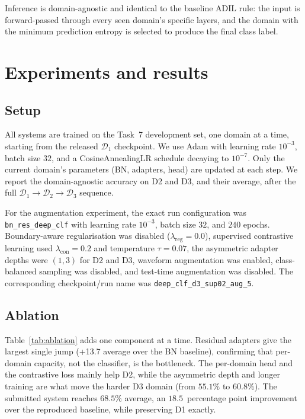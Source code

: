\documentclass{article}
\begin{document}
\begin{sloppy}
Inference is domain-agnostic and identical to the baseline ADIL rule: the
input is forward-passed through every seen domain's specific layers, and the
domain with the minimum prediction entropy is selected to produce the final
class label.


\section{Experiments and results}
\label{sec:results}

\subsection{Setup}
\label{ssec:setup}

All systems are trained on the Task~7 development set, one domain at a time,
starting from the released $\mathcal{D}_1$ checkpoint. We use Adam with
learning rate $10^{-3}$, batch size $32$, and a CosineAnnealingLR schedule
decaying to $10^{-7}$. Only the current domain's parameters (BN, adapters,
head) are updated at each step. We report the domain-agnostic accuracy on
D2 and D3, and their average, after the full $\mathcal{D}_1\!\rightarrow\!
\mathcal{D}_2\!\rightarrow\!\mathcal{D}_3$ sequence.

For the augmentation experiment, the exact run configuration was
\texttt{bn\_res\_deep\_clf} with learning rate $10^{-3}$, batch size $32$, and
$240$ epochs.  Boundary-aware regularisation was disabled
($\lambda_{\mathrm{reg}}=0.0$), supervised contrastive learning used
$\lambda_{\mathrm{con}}=0.2$ and temperature $\tau=0.07$, the asymmetric
adapter depths were $(1,3)$ for D2 and D3, waveform augmentation was enabled,
class-balanced sampling was disabled, and test-time augmentation was disabled.
The corresponding checkpoint/run name was
\texttt{deep\_clf\_d3\_sup02\_aug\_5}.

\subsection{Ablation}
\label{ssec:ablation}

Table~\ref{tab:ablation} adds one component at a time. Residual adapters give
the largest single jump (+13.7 average over the BN baseline), confirming that
per-domain capacity, not the classifier, is the bottleneck. The per-domain
head and the contrastive loss mainly help D2, while the asymmetric depth and
longer training are what move the harder D3 domain (from $55.1\%$ to
$60.8\%$). The submitted system reaches $68.5\%$ average, an $18.5$~percentage
point improvement over the reproduced baseline, while preserving D1 exactly.


\end{sloppy}
\end{document}
